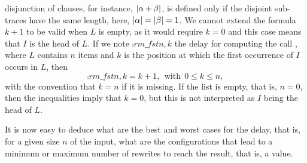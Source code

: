 disjunction of clauses, for instance, \(\lvert\alpha + \beta\rvert\), is defined
only if the disjoint sub\hyp{}traces have the same length, here,
\(\lvert\alpha\rvert = \lvert\beta\rvert = 1\). We cannot extend the formula
\(k+1\) to be valid when \(L\) is empty, as it would require \(k=0\)
and this case means that \(I\) is the head of \(L\). If we note
\(\comp{rm\_fst}{n,k}\) the delay for computing the call
, where \(L\) contains \(n\) items and
\(k\) is the position at which the first occurrence of \(I\) occurs in
\(L\), then\label{comp_rm_fst}
\[
\comp{rm\_fst}{n,k} = k + 1,\,\; \text{with} \,\; 0 \leqslant k
\leqslant n,
\]
with the convention that \(k=n\) if it is missing. If the list is
empty, that is, \(n=0\), then the inequalities imply that \(k=0\), but
this is not interpreted as \(I\) being the head of \(L\).

It is now easy to deduce what are the best and worst cases for the
delay, that is, for a given size \(n\) of the input, what are the
configurations that lead to a minimum or maximum number of rewrites to
reach the result, that is, a value.

